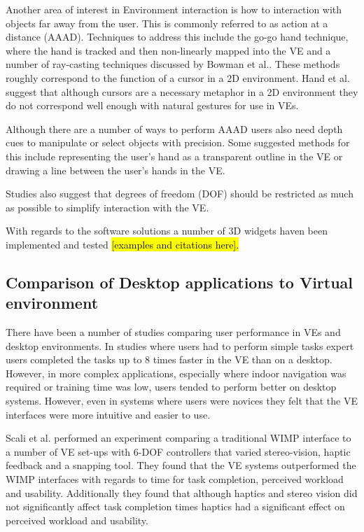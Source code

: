 \documentclass{sig-alternate-05-2015}
\begin{document}
 Another area of interest in Environment interaction is how to interaction with objects far away from the user. This is commonly referred to as action at a distance (AAAD). Techniques to address this include the go-go hand technique\cite{Poupyrev1996}, where the hand is tracked and then non-linearly mapped into the VE and a number of ray-casting techniques discussed by Bowman et al.\cite{Bowman2001}. These methods roughly correspond to the function of a cursor in a 2D environment. Hand et al. suggest that although cursors are a necessary metaphor in a 2D environment they do not correspond well enough with natural gestures for use in VEs\cite{Hand1997}.
 
 Although there are a number of ways to perform AAAD users also need depth cues to manipulate or select objects with precision.\cite{Schultheis2012} Some suggested methods for this include representing the user's hand as a transparent outline in the VE\cite{Hinckley1994} or drawing a line between the user's hands in the VE.\cite{Schultheis2012}
 
 
 Studies also suggest that degrees of freedom (DOF) should be restricted as much as possible to simplify interaction with the VE.\cite{Bowman2001}
 
 
  With regards to the software solutions a number of 3D widgets haven been implemented and tested \hl{[examples and citations here].}
 


\subsection{Comparison of Desktop applications to Virtual environment}
There have been a number of studies comparing user performance in VEs and desktop environments. In studies where users had to perform simple tasks expert users completed the tasks up to 8 times faster in the VE than on a desktop.\cite{Schultheis2012} However, in more complex applications, especially where indoor navigation was required or training time was low, users tended to perform better on desktop systems\cite{SousaSantos2009}. However, even in systems where users were novices they felt that the VE interfaces were more intuitive and easier to use\cite{Toma2012}.

 Scali et al. performed an experiment comparing a traditional WIMP interface to a number of VE set-ups with 6-DOF controllers that varied stereo-vision, haptic feedback and a snapping tool\cite{Scali2003}. They found that the VE systems outperformed the WIMP interfaces with regards to time for task completion, perceived workload and usability. Additionally they found that although haptics and stereo vision did not significantly affect task completion times haptics had a significant effect on perceived workload and usability.
 
\end{document}
